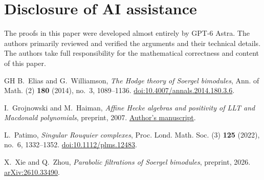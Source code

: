 \documentclass[11pt,a4paper]{article}
\numberwithin{equation}{section}
\theoremstyle{remark}
\begin{document}
\section*{Disclosure of AI assistance}
The proofs in this paper were developed almost entirely by GPT-6 Astra.
The authors primarily reviewed and verified the arguments and their technical
details. The authors take full responsibility for the mathematical correctness
and content of this paper.

\begin{thebibliography}{GH}
B.~Elias and G.~Williamson,
\emph{The Hodge theory of Soergel bimodules},
Ann. of Math. (2) \textbf{180} (2014), no.~3, 1089--1136.
\href{https://doi.org/10.4007/annals.2014.180.3.6}{doi:10.4007/annals.2014.180.3.6}.

I.~Grojnowski and M.~Haiman,
\emph{Affine Hecke algebras and positivity of LLT and Macdonald
polynomials}, preprint, 2007.
\href{https://math.berkeley.edu/~mhaiman/ftp/llt-positivity/new-version.pdf}{Author's manuscript}.

L.~Patimo,
\emph{Singular Rouquier complexes},
Proc. Lond. Math. Soc. (3) \textbf{125} (2022), no.~6, 1332--1352.
\href{https://doi.org/10.1112/plms.12483}{doi:10.1112/plms.12483}.

X.~Xie and Q.~Zhou,
\emph{Parabolic filtrations of Soergel bimodules},
preprint, 2026.
\href{https://arxiv.org/abs/2610.33490}{arXiv:2610.33490}.
\end{thebibliography}
\end{document}
